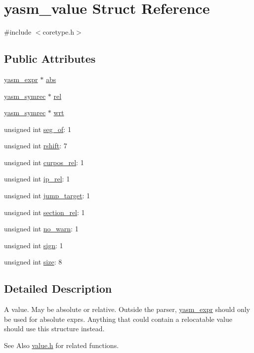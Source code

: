 \hypertarget{structyasm__value}{\section{yasm\-\_\-value Struct Reference}
\label{structyasm__value}
}


{\ttfamily \#include $<$coretype.\-h$>$}

\subsection*{Public Attributes}
\begin{DoxyCompactItemize}
\item 
\hyperlink{structyasm__expr}{yasm\-\_\-expr} $\ast$ \hyperlink{structyasm__value_a07c7cd6f8c7d13046fa33261bd6c2b31}{abs}
\item 
\hyperlink{structyasm__symrec}{yasm\-\_\-symrec} $\ast$ \hyperlink{structyasm__value_a5eba66589ecf8902279a9f865f1624da}{rel}
\item 
\hyperlink{structyasm__symrec}{yasm\-\_\-symrec} $\ast$ \hyperlink{structyasm__value_ac976e81c9a19ce934405d81d4f22bfcf}{wrt}
\item 
unsigned int \hyperlink{structyasm__value_a7c98791a8f0ea09712d820ee411efab4}{seg\-\_\-of}\-: 1
\item 
unsigned int \hyperlink{structyasm__value_a475cbc7240df61e11ac2e5da267d2153}{rshift}\-: 7
\item 
unsigned int \hyperlink{structyasm__value_a4a6d7102566cd451bfca9be1137f7bad}{curpos\-\_\-rel}\-: 1
\item 
unsigned int \hyperlink{structyasm__value_a80a21df6cc5fa6feb0a8270708e252fc}{ip\-\_\-rel}\-: 1
\item 
unsigned int \hyperlink{structyasm__value_a42ff68ffe2193227869a3d20553b6782}{jump\-\_\-target}\-: 1
\item 
unsigned int \hyperlink{structyasm__value_ae906d78ee730dd2a0127d28228db65d9}{section\-\_\-rel}\-: 1
\item 
unsigned int \hyperlink{structyasm__value_a9eb5b938e2e9aad4ce846b3dc4cfd5e6}{no\-\_\-warn}\-: 1
\item 
unsigned int \hyperlink{structyasm__value_a041ec908a206b4f83babed51b1ec9e8c}{sign}\-: 1
\item 
unsigned int \hyperlink{structyasm__value_a16f95079ddc125cdea2210955a30c350}{size}\-: 8
\end{DoxyCompactItemize}


\subsection{Detailed Description}
A value. May be absolute or relative. Outside the parser, \hyperlink{structyasm__expr}{yasm\-\_\-expr} should only be used for absolute exprs. Anything that could contain a relocatable value should use this structure instead. \begin{DoxySeeAlso}{See Also}
\hyperlink{value_8h}{value.\-h} for related functions. 
\end{DoxySeeAlso}



